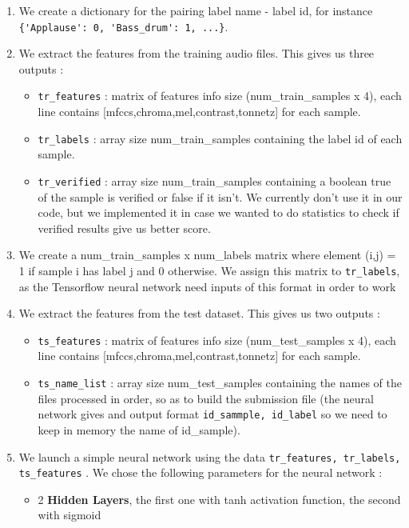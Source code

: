\documentclass{article} %
\begin{document}
			\begin{enumerate}
				\item We create a dictionary for the pairing label name - label id, for instance \verb+{'Applause': 0, 'Bass_drum': 1, ...}+.
				\item We extract the features from the training audio files. This gives us three outputs :
					\begin{itemize}
						\item \verb+tr_features+ : matrix of features info size (num\_train\_samples x 4), each line contains [mfccs,chroma,mel,contrast,tonnetz] for each sample.
						\item \verb+tr_labels+ : array size num\_train\_samples containing the label id of each sample.
						\item \verb+tr_verified+ : array size num\_train\_samples containing a boolean true of the sample is verified or false if it isn't. We currently don't use it in our code, but we implemented it in case we wanted to do statistics to check if verified results give us better score.
					\end{itemize}
				\item We create a num\_train\_samples x num\_labels matrix where element (i,j) = 1 if sample i has label j and 0 otherwise. We assign this matrix to \verb+tr_labels+, as the Tensorflow neural network need inputs of this format in order to work
				\item We extract the features from the test dataset. This gives us two outputs :
					\begin{itemize}
						\item \verb+ts_features+ : matrix of features info size (num\_test\_samples x 4), each line contains [mfccs,chroma,mel,contrast,tonnetz] for each sample.
						\item \verb+ts_name_list+ : array size num\_test\_samples containing the names of the files processed in order, so as to build the submission file (the neural network gives and output format \verb+id_sammple, id_label+ so we need to keep in memory the name of id\_sample).
					\end{itemize}
				\item We launch a simple neural network using the data \verb+tr_features, tr_labels, ts_features+ . We chose the following parameters for the neural network :
					\begin{itemize}
						\item 2 \textbf{Hidden Layers}, the first one with tanh activation function, the second with sigmoid

\end{itemize}
\end{enumerate}
\end{document}
